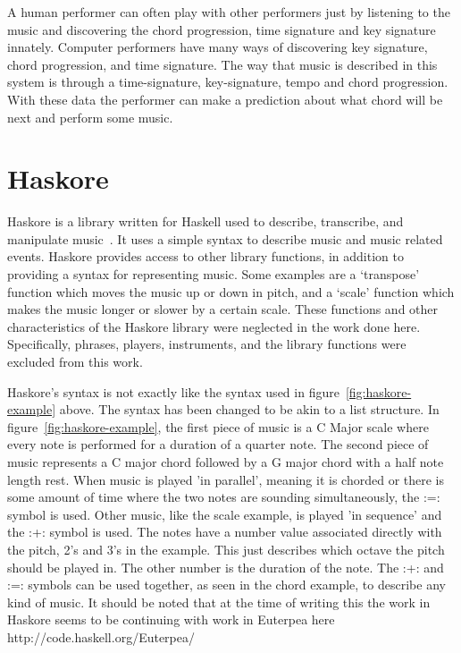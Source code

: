 \documentclass[12pt]{ucthesis}
\begin{document}
A human performer can often play with other performers just by listening to the music and discovering the chord progression, time signature and key signature innately. Computer performers have many ways of discovering key signature, chord progression, and time signature. The way that music is described in this system is through a time-signature, key-signature, tempo and chord progression. With these data the performer can make a prediction about what chord will be next and perform some music.

\section{Haskore}
\label{rw:haskore}

Haskore is a library written for Haskell used to describe, transcribe, and manipulate music~\cite{Haskore}. It uses a simple syntax to describe music and music related events. Haskore provides access to other library functions, in addition to providing a syntax for representing music. Some examples are a `transpose' function which moves the music up or down in pitch, and a `scale' function which makes the music longer or slower by a certain scale. These functions and other characteristics of the Haskore library were neglected in the work done here. Specifically, phrases, players, instruments, and the library functions were excluded from this work. 

Haskore's syntax is not exactly like the syntax used in figure~\ref{fig:haskore-example} above. The syntax has been changed to be akin to a list structure. In figure~\ref{fig:haskore-example}, the first piece of music is a C Major scale where every note is performed for a duration of a quarter note. The second piece of music represents a C major chord followed by a G major chord with a half note length rest. When music is played 'in parallel', meaning it is chorded or there is some amount of time where the two notes are sounding simultaneously, the :=: symbol is used. Other music, like the scale example, is played 'in sequence' and the :+: symbol is used. The notes have a number value associated directly with the pitch, 2's and 3's in the example. This just describes which octave the pitch should be played in. The other number is the duration of the note. The :+: and :=: symbols can be used together, as seen in the chord example, to describe any kind of music. It should be noted that at the time of writing this the work in Haskore seems to be continuing with work in Euterpea here http://code.haskell.org/Euterpea/
\end{document}
